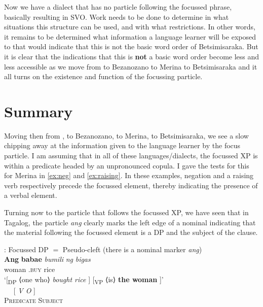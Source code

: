 \documentclass[output=paper]{langsci/langscibook}
\begin{document}
Now we have a dialect that has no particle following the focussed phrase,
basically resulting in SVO.  Work needs to be done to determine in what
situations this structure can be used, and with what restrictions.  In other
words, it remains to be determined what information a language learner will be
exposed to that would indicate that this is not the basic word order of
Betsimisaraka.  But it is clear that the indications that this is \textbf{not}
a basic word order become less and less accessible as we move from  to
Bezanozano to Merina to Betsimisaraka and it all turns on the existence and
function of the focussing particle.

\section{Summary}

Moving then from , to Bezanozano, to Merina, to Betsimisaraka, we
see a slow chipping away at the information given to the language learner by
the focus particle.  I am assuming that in all of these languages/dialects, the
focussed XP is within a predicate headed by an unpronounced copula. I gave the
tests for this for Merina in \eqref{ex:neg} and \eqref{ex:raising}. In these
examples, negation and a raising verb respectively precede the focussed
element, thereby indicating the presence of a verbal element.

Turning now to the particle that follows the focussed XP, we have seen that in
Tagalog, the particle \emph{ang} clearly marks the left edge of a nominal
indicating that the material following the focussed element is a DP and the
subject of the clause.

\ea  {}: Focussed DP $=$ Pseudo-cleft (there is a  nominal marker \emph{ang})\\
    \ea
    \gll  \textbf{Ang} \textbf{babae}  \emph{bumili} \emph{ng} \emph{bigas}\\
    \Nom{} woman \Nom{} \At.\textsc{buy} \Acc{} rice\\
    \glt `[\textsubscript{DP}  ⟨one who⟩ \emph{bought rice} ] [\textsubscript{VP} ⟨is⟩ \textbf{the woman} ]' \\
    \ex
     {~~} {[  \emph{V O} ]}\\
         \textsc{Predicate} {} \textsc{Subject}\\
    \z
\z
\end{document}
